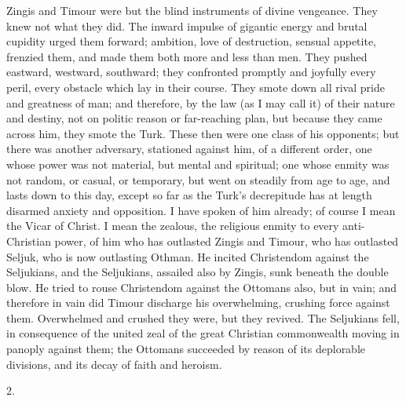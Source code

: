 Zingis and Timour were but the
blind instruments of divine vengeance. They knew not what they did.
The inward impulse of gigantic energy and brutal cupidity urged them
forward; ambition, love of destruction, sensual appetite, frenzied
them, and made them both more and less than men. They pushed eastward,
westward, southward; they confronted promptly and joyfully every
peril, every obstacle which lay in their course. They smote down all
rival pride and greatness of man; and therefore, by the law (as I may
call it) of their nature and destiny, not on politic reason or
far-reaching plan, but because they came across him, they smote the
Turk. These then were one class of his opponents; but there was
another adversary, stationed against him, of a different order, one
whose power was not material, but mental and spiritual; one whose
enmity was not random, or casual, or temporary, but went on steadily
from age to age, and lasts down to this day, except so far as the Turk's
decrepitude has at length disarmed anxiety and opposition. I have
spoken of him already; of course I mean the Vicar of Christ. I mean
the zealous, the religious enmity to every anti-Christian power, of
him who has outlasted Zingis and Timour, who has outlasted Seljuk, who
is now outlasting Othman. He incited Christendom against the
Seljukians, and the Seljukians, assailed also by Zingis, sunk beneath
the double blow. He tried to rouse Christendom against the Ottomans
also, but in vain; and therefore in vain did Timour discharge his
overwhelming, crushing force against them. Overwhelmed and crushed
they were, but they revived. The Seljukians fell, in consequence of
the united zeal of the great Christian commonwealth moving in panoply
against them; the Ottomans succeeded by reason of its deplorable
divisions, and its decay of faith and heroism.

2.

